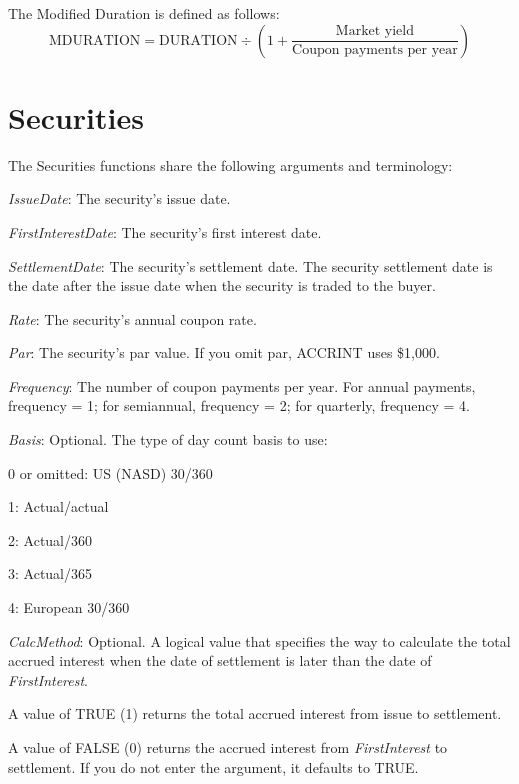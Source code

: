 \vspace{0.3cm}
The Modified Duration is defined as follows:
\begin{equation}
	\text{MDURATION} = \text{DURATION} \div \left({1+\frac{\text{Market yield}}{\text{Coupon payments per year}}}\right)
\end{equation}






\newpage
\section{Securities}
The Securities functions share the following arguments and terminology:

\vspace{0.3cm}
\textit{IssueDate}: The security's issue date.

\textit{FirstInterestDate}: The security's first interest date.

\textit{SettlementDate}: The security's settlement date. The security settlement date is the date after the issue date when the security is traded to the buyer.

\textit{Rate}: The security's annual coupon rate.

\textit{Par}: The security's par value. If you omit par, ACCRINT uses \$1,000.

\textit{Frequency}: The number of coupon payments per year. For annual payments, frequency = 1; for semiannual, frequency = 2; for quarterly, frequency = 4.

\vspace{0.3cm}
\textit{Basis}:  Optional. The type of day count basis to use:

0 or omitted: US (NASD) 30/360 

1: Actual/actual 

2: Actual/360 

3: Actual/365 

4: European 30/360 

\vspace{0.3cm}
\textit{CalcMethod}:  Optional. A logical value that specifies the way to calculate the total accrued interest when the date of settlement is later than the date of \textit{FirstInterest}. 

A value of TRUE (1) returns the total accrued interest from issue to settlement. 

A value of FALSE (0) returns the accrued interest from \textit{FirstInterest} to settlement. If you do not enter the argument, it defaults to TRUE.

